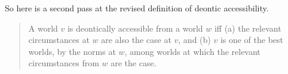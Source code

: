 
%
%
%

So here is a second pass at the revised definition of deontic accessibility.

\begin{quote}
  A world $v$ is deontically accessible from a world $w$ iff (a) the relevant
  circumstances at $w$ are also the case at $v$, and (b) $v$ is one of the best
  worlds, by the norms at $w$, among worlds at which the relevant circumstances
  from $w$ are the case.
\end{quote}

